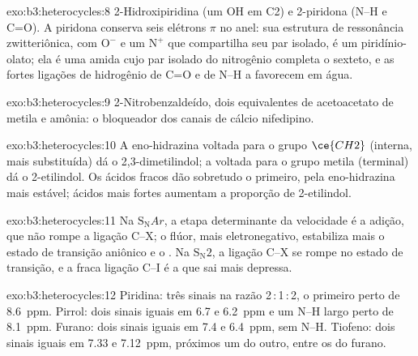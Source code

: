 \begin{solution}{exo:b3:heterocycles:8}
2-Hidroxipiridina (um OH em C2) e 2-piridona (N--H e C=O). A piridona conserva seis
elétrons $\pi$ no anel: sua estrutura de ressonância zwitteriônica, com $\mathrm{O^-}$ e um
$\mathrm{N^+}$ que compartilha seu par isolado, é um piridínio-olato; ela é uma amida cujo
par isolado do nitrogênio completa o sexteto, e as fortes ligações de hidrogênio de C=O e de N--H
a favorecem em água.
\end{solution}

\begin{solution}{exo:b3:heterocycles:9}
2-Nitrobenzaldeído, dois equivalentes de acetoacetato de metila e amônia: o
bloqueador dos canais de cálcio nifedipino.
\end{solution}

\begin{solution}{exo:b3:heterocycles:10}
A eno-hidrazina voltada para o grupo $\ce{CH2}$ (interna, mais substituída) dá o
2,3-dimetilindol; a voltada para o grupo metila (terminal) dá o 2-etilindol.
Os ácidos fracos dão sobretudo o primeiro, pela eno-hidrazina mais estável;
ácidos mais fortes aumentam a proporção de 2-etilindol.
\end{solution}

\begin{solution}{exo:b3:heterocycles:11}
Na $\mathrm S_\mathrm NAr$, a etapa determinante da velocidade é a adição, que não rompe a ligação C--X;
o flúor, mais eletronegativo, estabiliza mais o estado de transição aniônico
e o . Na $\mathrm S_\mathrm N2$, a ligação C--X se rompe no
estado de transição, e a fraca ligação C--I é a que sai mais depressa.
\end{solution}

\begin{solution}{exo:b3:heterocycles:12}
Piridina: três sinais na razão 2\,:\,1\,:\,2, o primeiro perto de \qty{8.6}{ppm}. Pirrol: dois sinais
iguais em 6.7 e \qty{6.2}{ppm} e um N--H largo perto de \qty{8.1}{ppm}. Furano: dois sinais iguais em
7.4 e \qty{6.4}{ppm}, sem N--H. Tiofeno: dois sinais iguais em 7.33 e \qty{7.12}{ppm}, próximos
um do outro, entre os do furano.
\end{solution}

